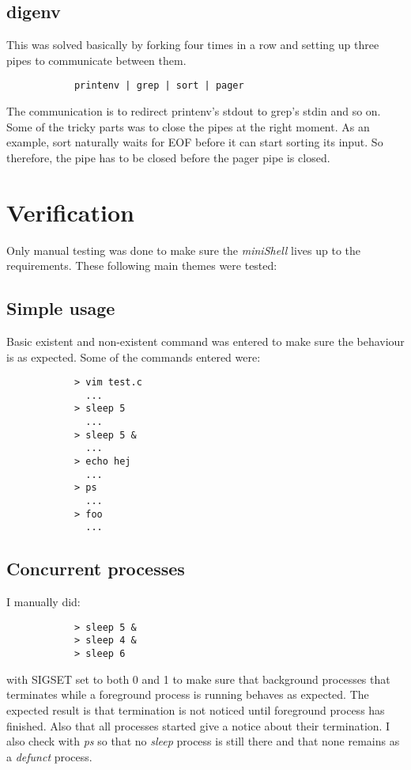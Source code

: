 \documentclass{article}
\begin{document}
   \subsection{digenv}
        This was solved basically by forking four times in a row and setting up three
        pipes to communicate between them.
        \begin{verbatim}
            printenv | grep | sort | pager
        \end{verbatim}
        The communication is to redirect printenv's stdout to grep's stdin and so on.
        Some of the tricky parts was to close the pipes at the right moment. As an
        example, sort naturally waits for EOF before it can start sorting its input.
        So therefore, the pipe has to be closed before the pager pipe is closed.
        
\section{Verification}
    Only manual testing was done to make sure the \emph{miniShell} lives up to
    the requirements. These following main themes were tested:
    \subsection{Simple usage}
        Basic existent and non-existent command was entered to make sure the
        behaviour is as expected. Some of the commands entered were:
        \begin{verbatim}
            > vim test.c
              ...
            > sleep 5
              ...
            > sleep 5 &
              ...
            > echo hej
              ...
            > ps
              ...
            > foo
              ...
        \end{verbatim}

    \subsection{Concurrent processes}
        I manually did:
        \begin{verbatim}
            > sleep 5 &
            > sleep 4 &
            > sleep 6
        \end{verbatim}
        with SIGSET set to both 0 and 1 to make sure that background processes
        that terminates while a foreground process is running behaves as
        expected. The expected result is that termination is not noticed until
        foreground process has finished. Also that all processes started give a
        notice about their termination. I also check with \emph{ps} so that no
        \emph{sleep} process is still there and that none remains as a
        \emph{defunct} process.
\end{document}
